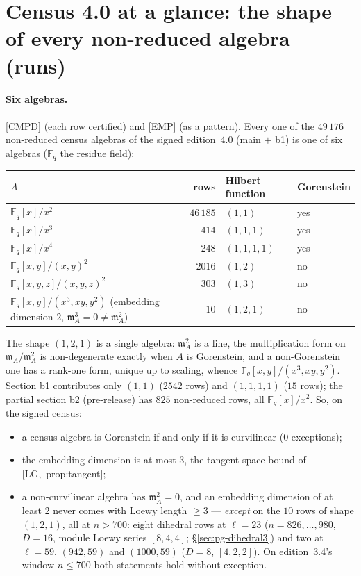 \documentclass[11pt]{article}
\newcommand{\F}{\mathbb{F}}
\newcommand{\m}{\mathfrak{m}}
\newcommand{\CMPD}{\textsf{\small[CMPD]}}
\newcommand{\EMP}{\textsf{\small[EMP]}}
\begin{document}
\section{Census 4.0 at a glance: the shape of every non-reduced algebra (runs)}\label{sec:pg-census34}\label{sec:pg-census40}

\paragraph{Six algebras.} \CMPD{} (each row certified) and \EMP{} (as a pattern). Every one of the $49\,176$ non-reduced census algebras of
the signed edition~4.0 (main $+$ b1) is one of six algebras ($\F_q$ the residue field):
\begin{center}\small
\begin{tabular}{@{}lrll@{}}
\toprule
$A$ & rows & Hilbert function & Gorenstein \\
\midrule
$\F_q[x]/x^{2}$ & $46\,185$ & $(1,1)$ & yes \\
$\F_q[x]/x^{3}$ & $414$ & $(1,1,1)$ & yes \\
$\F_q[x]/x^{4}$ & $248$ & $(1,1,1,1)$ & yes \\
$\F_q[x,y]/(x,y)^{2}$ & $2016$ & $(1,2)$ & no \\
$\F_q[x,y,z]/(x,y,z)^{2}$ & $303$ & $(1,3)$ & no \\
$\F_q[x,y]/(x^{3},xy,y^{2})$ (embedding dimension $2$, $\m_A^{3}=0\ne\m_A^{2}$) & $10$ & $(1,2,1)$ & no \\
\bottomrule
\end{tabular}
\end{center}
The shape $(1,2,1)$ is a single algebra: $\m_A^{2}$ is a line, the multiplication form on $\m_A/\m_A^{2}$ is non-degenerate exactly when $A$ is
Gorenstein, and a non-Gorenstein one has a rank-one form, unique up to scaling, whence $\F_q[x,y]/(x^{3},xy,y^{2})$.
Section b1 contributes only $(1,1)$ ($2542$ rows) and $(1,1,1,1)$ ($15$ rows); the partial section b2 (pre-release) has $825$ non-reduced
rows, all $\F_q[x]/x^{2}$. So, on the signed census:
\begin{itemize}[leftmargin=1.6em,itemsep=1pt]
\item a census algebra is Gorenstein if and only if it is curvilinear ($0$ exceptions);
\item the embedding dimension is at most $3$, the tangent-space bound of [LG,~prop:tangent];
\item a non-curvilinear algebra has $\m_A^{2}=0$, and an embedding dimension of at least $2$ never comes with Loewy length $\ge3$ --- \emph{except} on
  the $10$ rows of shape $(1,2,1)$, all at $n>700$: eight dihedral rows at $\ell=23$ ($n=826,\dots,980$, $D=16$, module Loewy series $[8,4,4]$;
  \S\ref{sec:pg-dihedral3}) and two at $\ell=59$, $(942,59)$ and $(1000,59)$ ($D=8$, $[4,2,2]$). On edition~3.4's window $n\le700$ both
  statements hold without exception.
\end{itemize}
\end{document}

